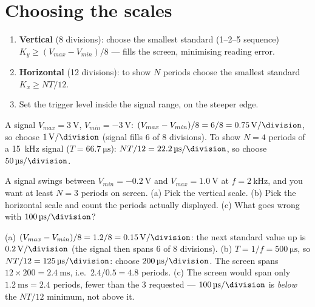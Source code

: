 \documentclass[11pt,a4paper,oneside]{book}
\begin{document}
\section{Choosing the scales}
\begin{protocol}
\begin{enumerate}[leftmargin=1.5cm]
  \item \textbf{Vertical} (8 divisions): choose the smallest standard
        (1--2--5 sequence) $K_y\ge(V_{max}-V_{min})/8$ --- fills the screen,
        minimising reading error.
  \item \textbf{Horizontal} (12 divisions): to show $N$ periods choose the
        smallest standard $K_x\ge NT/12$.
  \item Set the trigger level inside the signal range, on the steeper edge.
\end{enumerate}
\end{protocol}

\begin{wexample}
A signal $V_{max}=\qty{3}{\volt}$, $V_{min}=\qty{-3}{\volt}$:
$(V_{max}-V_{min})/8=6/8=\qty{0.75}{\volt\per\division}$, so choose $\qty{1}{\volt\per\division}$
(signal fills 6 of 8 divisions). To show $N=4$ periods of a
\qty{15}{\kilo\hertz} signal ($T=\qty{66.7}{\micro\second}$):
$NT/12=\qty{22.2}{\micro\second\per\division}$, so choose $\qty{50}{\micro\second\per\division}$.
\end{wexample}

\begin{exercise}
A signal swings between $V_{min}=\qty{-0.2}{\volt}$ and
$V_{max}=\qty{1.0}{\volt}$ at $f=\qty{2}{\kilo\hertz}$, and you want at least
$N=3$ periods on screen. (a) Pick the vertical scale. (b) Pick the horizontal
scale and count the periods actually displayed. (c) What goes wrong with
$\qty{100}{\micro\second\per\division}$?
\end{exercise}
\begin{solution}
(a) $(V_{max}-V_{min})/8=1.2/8=\qty{0.15}{\volt\per\division}$: the next standard value
up is $\qty{0.2}{\volt\per\division}$ (the signal then spans 6 of 8 divisions).
(b) $T=1/f=\qty{500}{\micro\second}$, so $NT/12=\qty{125}{\micro\second\per\division}$:
choose $\qty{200}{\micro\second\per\division}$. The screen spans
$12\times200=\qty{2.4}{\milli\second}$, i.e.\ $2.4/0.5=4.8$ periods.
(c) The screen would span only $\qty{1.2}{\milli\second}=2.4$ periods, fewer than
the 3 requested --- $\qty{100}{\micro\second\per\division}$ is \emph{below} the
$NT/12$ minimum, not above it.
\end{solution}
\end{document}
